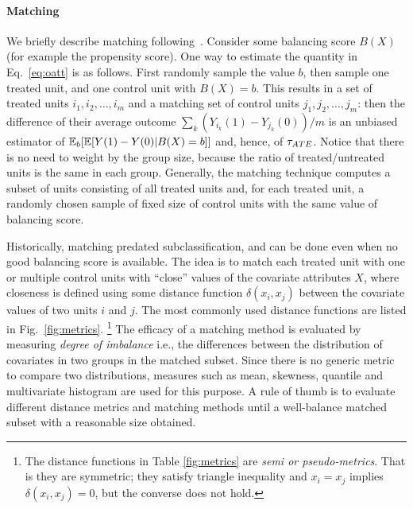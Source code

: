 \paragraph*{\bf{Matching}} We briefly describe matching
following~\cite{Rubin1983b}.  Consider some balancing score $B(X)$
(for example the propensity score).  One way to estimate the quantity
in Eq.~\ref{eq:oatt} is as follows.  First randomly sample the value
$b$, then sample one treated unit, and one control unit with $B(X)=b$.
This results in a set of treated units $i_1, i_2, \ldots, i_m$ and a
matching set of control units $j_1, j_2, \ldots, j_m$: then the
difference of their average outcome
$\sum_k (Y_{i_k}(1) - Y_{j_k}(0))/m$ is an unbiased estimator of
$\mathbb{E}_b[\mathbb{E}[Y(1)-Y(0)| B(X)=b]]$ and, hence, of ${\tau_{ATE}}$.  Notice that
there is no need to weight by the group size, because the ratio of
treated/untreated units is the same in each group.  Generally, the
matching technique computes a subset of units consisting of all
treated units and, for each treated unit, a randomly chosen sample of
fixed size of control units with the same value of balancing score.


Historically, matching  predated
subclassification, and can be done even when no good balancing score
is available.
%
%
The idea is to match each treated unit with one or multiple control
units with ``close'' values of the covariate attributes $X$, where
closeness is defined using some distance function $\delta(x_i,x_j)$
between the covariate values of two units $i$ and $j$.  The most
commonly used distance functions are listed in
Fig.~\ref{fig:metrics}. \footnote{The distance functions in Table
  \ref{fig:metrics} are {\em semi or pseudo-metrics}. That is they are
  symmetric; they satisfy triangle inequality and $x_i=x_j$ implies
  $\delta(x_i,x_j)=0$, but the converse does not hold.} The efficacy
of a matching method is evaluated by measuring {\em degree of
  imbalance} i.e., the differences between the distribution of
covariates in two groups in the matched subset. Since there is no
generic metric to compare two distributions, measures such as mean,
skewness, quantile and multivariate histogram are used for this
purpose.  A rule of thumb is to
evaluate different distance metrics and matching methods until a
well-balance matched subset with a reasonable size obtained.



